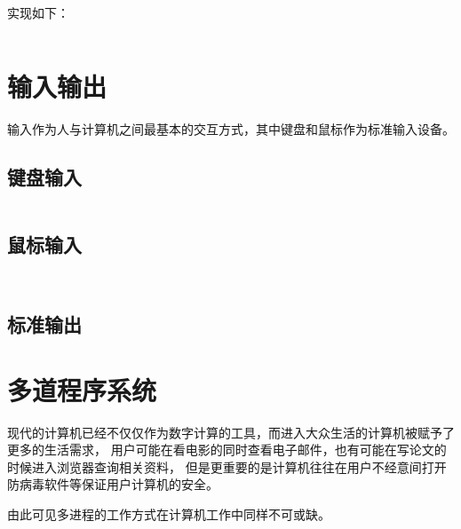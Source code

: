 \documentclass{swfcthesis}
\begin{document}
		实现如下：

		\begin{listing}[H]
		\inputminted[tabsize=2, firstline=128, lastline=141,
		linenos=true]{c}{../ZOS/src/kernel/memory.c}
		\end{listing}

    \section{输入输出}
	
		输入作为人与计算机之间最基本的交互方式，其中键盘和鼠标作为标准输入设备。

		\subsection{键盘输入}
		
		\begin{listing}[H]
		\inputminted[tabsize=2, firstline=162, lastline=170,
		linenos=true]{c}{../ZOS/src/kernel/bootpack.c}
		\end{listing}
		
		\subsection{鼠标输入}

		\begin{listing}[H]
		\inputminted[tabsize=2, firstline=247, lastline=265,
		linenos=true]{c}{../ZOS/src/kernel/bootpack.c}
		\inputminted[tabsize=2, firstline=329, lastline=338,
		linenos=true]{c}{../ZOS/src/kernel/bootpack.c}
		\end{listing}

		\subsection{标准输出}
		
                
	\section{多道程序系统}

		现代的计算机已经不仅仅作为数字计算的工具，而进入大众生活的计算机被赋予了更多的生活需求，
		用户可能在看电影的同时查看电子邮件，也有可能在写论文的时候进入浏览器查询相关资料，
		但是更重要的是计算机往往在用户不经意间打开防病毒软件等保证用户计算机的安全\cite{tanenbaum2009modern}。

		由此可见多进程的工作方式在计算机工作中同样不可或缺。
\end{document}
